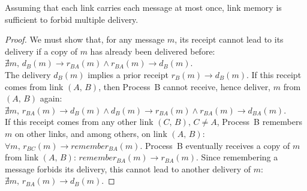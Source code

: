 

\begin{theorem}
  Assuming that each link carries each message at most once, link memory is
  sufficient to forbid multiple delivery.
\end{theorem}

\begin{proof}
  We must show that, for any message $m$, its receipt cannot lead to its
  delivery if a copy of $m$ has already been delivered before:
  $\nexists m,\, d_B(m) \rightarrow r_{BA}(m) \wedge r_{BA}(m) \rightarrow
  d_B(m)$.\\
  The delivery $d_B(m)$ implies a prior receipt $r_B(m) \rightarrow d_B(m)$.  If
  this receipt comes from link $(A,\, B)$, then Process~B cannot receive, hence
  deliver, $m$ from $(A,\, B)$ again:
  $\nexists m,\, r_{BA}(m) \rightarrow d_B(m) \wedge d_B(m) \rightarrow
  r_{BA}(m) \wedge r_{BA}(m) \rightarrow d_{BA}(m)$.\\
  If this receipt comes from any other link $(C,\, B),\, C\neq A$, Process~B
  remembers $m$ on other links, and among others, on link $(A,\, B)$:
  $\forall m,\, r_{BC}(m) \rightarrow remember_{BA}(m)$. Process~B eventually
  receives a copy of $m$ from link $(A,\,B)$:
  $remember_{BA}(m) \rightarrow r_{BA}(m)$. Since remembering a message forbids
  its delivery, this cannot lead to another delivery of $m$:
  $\nexists m,\, r_{BA}(m) \rightarrow d_{B}(m)$.
\end{proof}


